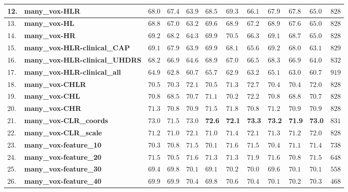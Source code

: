 {\begin{longtable}[H]{|p{0.6cm}|p{10.3cm}|p{1.1cm}|p{1.1cm}|p{1.1cm}|p{1.1cm}|p{1.1cm}|p{1.1cm}|p{1.1cm}|p{1.1cm}|p{1.1cm}|r|}
12. & \textbf{many\_vox-HLR} & $68.0$ & $67.4$ & $63.9$ & $68.5$ & $69.3$ & $66.1$ & $67.9$ & $67.8$ & $65.0$ & $828$ \\ \hline
13. & \textbf{many\_vox-HL} & $68.8$ & $67.0$ & $63.2$ & $69.6$ & $68.9$ & $67.2$ & $68.9$ & $67.6$ & $65.0$ & $828$ \\ \hline
14. & \textbf{many\_vox-HR} & $69.2$ & $68.2$ & $64.3$ & $69.9$ & $70.5$ & $66.3$ & $69.1$ & $68.7$ & $65.0$ & $828$ \\ \hline
15. & \textbf{many\_vox-HLR-clinical\_CAP} & $69.1$ & $67.9$ & $63.9$ & $69.9$ & $68.1$ & $65.6$ & $69.2$ & $68.0$ & $63.1$ & $829$ \\ \hline
16. & \textbf{many\_vox-HLR-clinical\_UHDRS} & $68.2$ & $66.9$ & $64.6$ & $68.9$ & $67.0$ & $66.5$ & $68.3$ & $66.9$ & $64.0$ & $832$ \\ \hline
17. & \textbf{many\_vox-HLR-clinical\_all} & $64.9$ & $62.8$ & $60.7$ & $65.7$ & $62.9$ & $63.2$ & $65.1$ & $63.0$ & $60.7$ & $919$ \\ \hline
18. & \textbf{many\_vox-CHLR} & $70.5$ & $70.3$ & $72.1$ & $70.5$ & $71.3$ & $72.7$ & $70.4$ & $70.4$ & $72.0$ & $828$ \\ \hline
19. & \textbf{many\_vox-CHL} & $70.8$ & $68.5$ & $70.7$ & $71.1$ & $70.2$ & $72.2$ & $70.8$ & $68.8$ & $70.7$ & $828$ \\ \hline
20. & \textbf{many\_vox-CHR} & $71.3$ & $70.8$ & $70.9$ & $71.5$ & $71.8$ & $70.8$ & $71.2$ & $70.9$ & $70.9$ & $828$ \\ \hline
21. & \textbf{many\_vox-CLR\_coords} & $73.0$ & $71.5$ & $73.0$ &  \textbf{72.6} &  \textbf{72.1} &  \textbf{73.3} &  \textbf{73.2} &  \textbf{71.9} &  \textbf{73.0} & $831$ \\ \hline
22. & \textbf{many\_vox-CLR\_scale} & $71.2$ & $71.0$ & $72.1$ & $71.0$ & $71.4$ & $72.1$ & $71.3$ & $71.2$ & $72.0$ & $828$ \\ \hline
23. & \textbf{many\_vox-feature\_10} & $70.3$ & $70.8$ & $71.5$ & $70.1$ & $71.6$ & $71.5$ & $70.4$ & $71.1$ & $71.4$ & $738$ \\ \hline
24. & \textbf{many\_vox-feature\_20} & $71.5$ & $70.5$ & $71.6$ & $71.3$ & $71.3$ & $71.9$ & $71.6$ & $70.8$ & $71.5$ & $648$ \\ \hline
25. & \textbf{many\_vox-feature\_30} & $69.4$ & $69.8$ & $70.1$ & $69.1$ & $70.2$ & $70.0$ & $69.6$ & $70.1$ & $70.1$ & $558$ \\ \hline
26. & \textbf{many\_vox-feature\_40} & $69.9$ & $69.9$ & $70.4$ & $69.8$ & $70.6$ & $70.4$ & $70.1$ & $70.2$ & $70.3$ & $468$ \\ \hline

\end{longtable}}
